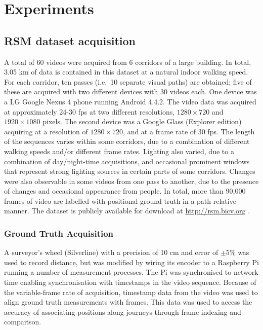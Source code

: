 \section{Experiments}
\label{sec:experiments}

\subsection{RSM dataset acquisition}
\label{sec:Dataset}
A total of 60 videos were acquired from 6 corridors of a large building. In total, 3.05 km of data is contained in this dataset at a natural indoor walking speed.  For each corridor, ten passes (i.e.\ 10 separate visual paths) are obtained; five of these are acquired with two different devices with 30 videos each. One device was a LG Google Nexus 4 phone running Android 4.4.2.  The video data was acquired at approximately 24-30 fps at two different resolutions, $1280 \times 720$ and $1920\times 1080$ pixels.  The second device was a Google Glass (Explorer edition) acquiring at a resolution of $1280 \times 720$, and at a frame rate of 30 fps. The length of the sequences varies within some corridors, due to a combination of different walking speeds and/or different frame rates. Lighting also varied, due to a combination of day/night-time acquisitions, and occasional prominent windows that represent strong lighting sources in certain parts of some corridors.  Changes were also observable in some videos from one pass to another, due to the presence of changes and occasional appearance from people. In total, more than 90,000 frames of video are labelled with positional ground truth in a path relative manner. The dataset is publicly available for download at \url{http://rsm.bicv.org} \citep{Rivera-RubioRSM}.

\subsubsection{Ground Truth Acquisition}
\label{sec:dataset}
A surveyor's wheel (Silverline) with a precision of 10 cm and error of $\pm 5\%$ was used to record distance, but was modified by wiring its encoder to a Raspberry Pi running a number of measurement processes.  The Pi was synchronised to network time enabling synchronisation with timestamps in the video sequence.  Because of the variable-frame rate of acquisition, timestamp data from the video was used to align ground truth measurements with frames. This data was used to access the accuracy of associating positions along journeys through frame indexing and comparison.


